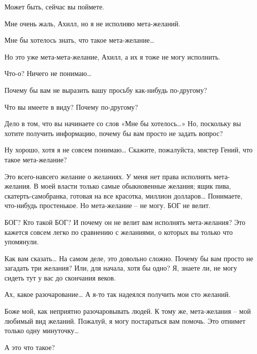 \documentclass[../main.tex]{subfiles}
\begin{document}
\begin{Dialogue}
\begin{sublevel}
\begin{sublevel}
 Может быть, сейчас вы поймете.

 Мне очень жаль, Ахилл, но я не исполняю мета-желаний.

 Мне бы хотелось знать, что такое мета-желание\ldots{}

 Но это уже мета-мета-желание, Ахилл, а их я тоже не могу исполнить.

 Что-о? Ничего не понимаю\ldots{}

 Почему бы вам не выразить вашу просьбу как-нибудь по-другому?

 Что вы имеете в виду? Почему по-другому?

 Дело в том, что вы начинаете со слов «Мне бы хотелось\ldots» Но, поскольку вы хотите получить информацию, почему бы вам просто не задать вопрос?

 Ну хорошо, хотя я не совсем понимаю\ldots{} Скажите, пожалуйста, мистер Гений, что такое мета-желание?

 Это всего-навсего желание о желаниях. У меня нет права исполнять мета-желания. В моей власти только самые обыкновенные желания; ящик пива, скатерть-самобранка, готовая на все красотка, миллион долларов\ldots{} Понимаете, что-нибудь простенькое. Но мета-желание \--- не могу. БОГ не велит.

 БОГ? Кто такой БОГ? И почему он не велит вам исполнять мета-желания? Это кажется совсем легко по сравнению с желаниями, о которых вы только что упомянули.

 Как вам сказать\ldots{} На самом деле, это довольно сложно. Почему бы вам просто не загадать три желания? Или, для начала, хотя бы одно? Я, знаете ли, не могу сидеть тут у вас до скончания веков.

 Ах, какое разочарование\ldots{} А я-то так надеялся получить мои сто желаний.

 Боже мой, как неприятно разочаровывать людей. К тому же, мета-желания \--- мой любимый вид желаний. Пожалуй, я могу постараться вам помочь. Это отнимет только одну минуточку\ldots{}


 А это что такое?


\end{sublevel}
\end{sublevel}
\end{Dialogue}
\end{document}
